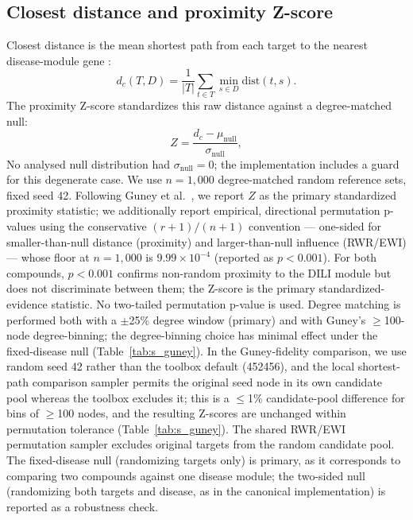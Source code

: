 \subsection{Closest distance and proximity Z-score}
Closest distance is the mean shortest path from each target to the nearest disease-module gene \citep{Guney2016}:
\begin{equation}
d_c(T,D) = \frac{1}{|T|}\sum_{t\in T}\min_{s\in D}\mathrm{dist}(t,s).
\label{eq:dc}
\end{equation}
The proximity Z-score standardizes this raw distance against a degree-matched null:
\begin{equation}
Z = \frac{d_c - \mu_{\text{null}}}{\sigma_{\text{null}}},
\label{eq:proxz}
\end{equation}
No analysed null distribution had $\sigma_{\text{null}}=0$; the implementation includes a guard for this degenerate case. We use $n=1{,}000$ degree-matched random reference sets, fixed seed 42. Following Guney et al.\ \citep{Guney2016}, we report $Z$ as the primary standardized proximity statistic; we additionally report empirical, directional permutation p-values using the conservative $(r+1)/(n+1)$ convention \citep{Phipson2010} --- one-sided for smaller-than-null distance (proximity) and larger-than-null influence (RWR/EWI) --- whose floor at $n=1{,}000$ is $9.99\times10^{-4}$ (reported as $p<0.001$). For both compounds, $p<0.001$ confirms non-random proximity to the DILI module but does not discriminate between them; the Z-score is the primary standardized-evidence statistic. No two-tailed permutation p-value is used. Degree matching is performed both with a $\pm$25\% degree window (primary) and with Guney's $\geq$100-node degree-binning; the degree-binning choice has minimal effect under the fixed-disease null (Table~\ref{tab:s_guney}). In the Guney-fidelity comparison, we use random seed 42 rather than the toolbox default (452456), and the local shortest-path comparison sampler permits the original seed node in its own candidate pool whereas the toolbox excludes it; this is a $\leq$1\% candidate-pool difference for bins of $\geq$100 nodes, and the resulting Z-scores are unchanged within permutation tolerance (Table~\ref{tab:s_guney}). The shared RWR/EWI permutation sampler excludes original targets from the random candidate pool. The fixed-disease null (randomizing targets only) is primary, as it corresponds to comparing two compounds against one disease module; the two-sided null (randomizing both targets and disease, as in the canonical implementation) is reported as a robustness check.

